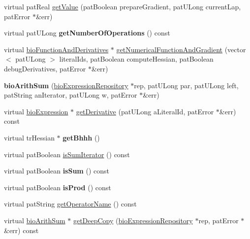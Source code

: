 \begin{DoxyCompactItemize}
\item 
virtual pat\+Real \hyperlink{classbio_arith_sum_a96362470d300fec04262c86df3864190}{get\+Value} (pat\+Boolean prepare\+Gradient, pat\+U\+Long current\+Lap, pat\+Error $\ast$\&err)
\item 
\mbox{\label{classbio_arith_sum_a9793d7e0e30ec84780582eb7157c1f3e}} 
virtual pat\+U\+Long {\bfseries get\+Number\+Of\+Operations} () const
\item 
virtual \hyperlink{classbio_function_and_derivatives}{bio\+Function\+And\+Derivatives} $\ast$ \hyperlink{classbio_arith_sum_a18cf2d6545bce0712f755c6eaf69407a}{get\+Numerical\+Function\+And\+Gradient} (vector$<$ pat\+U\+Long $>$ literal\+Ids, pat\+Boolean compute\+Hessian, pat\+Boolean debug\+Derivatives, pat\+Error $\ast$\&err)
\item 
\mbox{\label{classbio_arith_sum_af5f0818c44873b2cb1c10769468dca23}} 
{\bfseries bio\+Arith\+Sum} (\hyperlink{classbio_expression_repository}{bio\+Expression\+Repository} $\ast$rep, pat\+U\+Long par, pat\+U\+Long left, pat\+String an\+Iterator, pat\+U\+Long w, pat\+Error $\ast$\&err)
\item 
virtual \hyperlink{classbio_expression}{bio\+Expression} $\ast$ \hyperlink{classbio_arith_sum_a2c030d0fea64581fe6f33031d3d3c977}{get\+Derivative} (pat\+U\+Long a\+Literal\+Id, pat\+Error $\ast$\&err) const
\item 
\mbox{\label{classbio_arith_sum_ae22ebe2bc507588c53bdac6144381adf}} 
virtual tr\+Hessian $\ast$ {\bfseries get\+Bhhh} ()
\item 
virtual pat\+Boolean \hyperlink{classbio_arith_sum_ab0747dc4d0f4fbe2cb246b265ec3cd11}{is\+Sum\+Iterator} () const
\item 
\mbox{\label{classbio_arith_sum_ac2adee4ec319273e2e571a5dc3fd5fdf}} 
virtual pat\+Boolean {\bfseries is\+Sum} () const
\item 
\mbox{\label{classbio_arith_sum_a44affda18b23bdbfae680143df4293cb}} 
virtual pat\+Boolean {\bfseries is\+Prod} () const
\item 
virtual pat\+String \hyperlink{classbio_arith_sum_a9e0ab0b9062a7cd80e70fc16505bc282}{get\+Operator\+Name} () const
\item 
virtual \hyperlink{classbio_arith_sum}{bio\+Arith\+Sum} $\ast$ \hyperlink{classbio_arith_sum_ab3264f5810c52c59b96ae72370e441ff}{get\+Deep\+Copy} (\hyperlink{classbio_expression_repository}{bio\+Expression\+Repository} $\ast$rep, pat\+Error $\ast$\&err) const

\end{DoxyCompactItemize}

